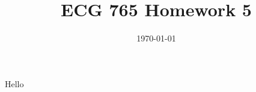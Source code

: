 \documentclass[12pt,letterpaper]{article}
\title{ECG 765 Homework 5}
\date {\today}
\begin{document}
Hello
\end{document}
